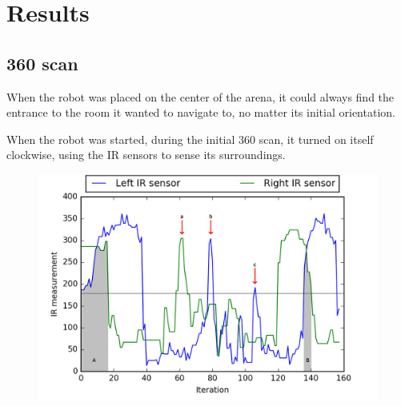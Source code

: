 \section{Results}

\subsection{360 scan}

When the robot was placed on the center of the arena, it could always find the entrance to the room it wanted to navigate to, no matter its initial orientation.

When the robot was started, during the initial 360 scan, it turned on itself clockwise, using the IR sensors to sense its surroundings.

\begin{figure}[ht]
    \centering
    \includegraphics[width=0.7\linewidth]{res/360-scan-plot.png}
    \caption{}
\end{figure}


\newpage
